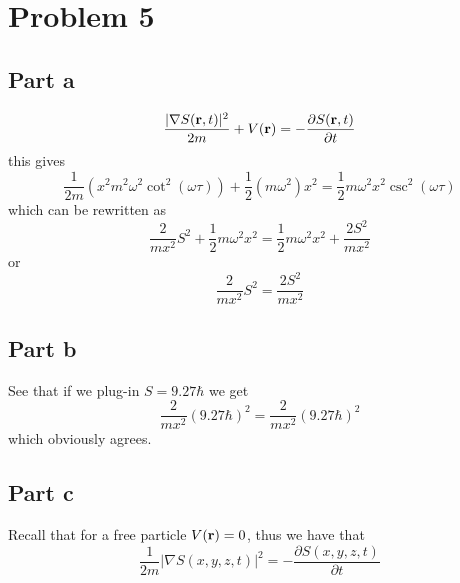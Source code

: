 \documentclass[12pt]{report}
\newcommand{\rb}{\bold{r}}
\begin{document}
\section*{Problem 5}
\subsection*{Part a}
\begin{align*}
    \frac{|\nabla S(\rb,t)|^2}{2m} + V(\rb) = -\frac{\partial S(\rb,t)}{\partial t}
\end{align*}
this gives
\begin{equation*}
    \frac{1}{2m}(x^2m^2\omega^2 \cot^2(\omega \tau)) + \frac{1}{2}(m\omega^2)x^2 = \frac{1}{2}m\omega^2x^2 \csc^2(\omega \tau)
\end{equation*}
which can be rewritten as
\begin{equation*}
    \frac{2}{mx^2} S^2 +  \frac{1}{2}m\omega^2 x^2 = \frac{1}{2}m\omega^2 x^2 + \frac{2S^2}{mx^2}
\end{equation*}
or
\begin{equation*}
     \frac{2}{mx^2} S^2 = \frac{2S^2}{mx^2}
\end{equation*}

\subsection*{Part b}
See that if we plug-in $S = 9.27 \hbar$
we get
\begin{equation*}
    \frac{2}{mx^2} (9.27 \hbar)^2 = \frac{2}{mx^2} (9.27 \hbar)^2
\end{equation*}
which obviously agrees.

\subsection*{Part c}
Recall that for a free particle $V(\rb) = 0$, thus we have that
\begin{equation*}
   \frac{1}{2m}|\nabla S(x,y,z,t)|^2 = -\frac{\partial S(x,y,z,t)}{\partial t}
\end{equation*}
\end{document}
